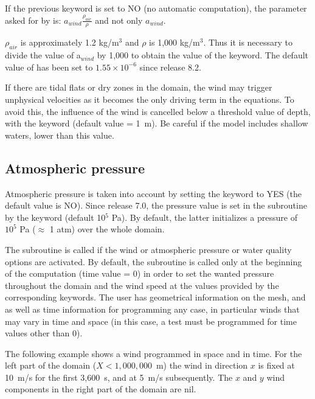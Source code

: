 If the previous keyword is set to NO (no automatic computation), the parameter
 asked for by  is:
$a_{wind} \frac{\rho_{air}}{\rho}$ and not only $a_{wind}$.

$\rho_{air}$ is approximately 1.2 kg/m$^3$ and $\rho$ is 1,000 kg/m$^3$.
Thus it is necessary to divide the value of a$_{wind}$ by 1,000
to obtain the value of the  keyword.
The default value of  has been set to
$1.55 \times 10^{-6}$ since release 8.2.

If there are tidal flats or dry zones in the domain, the wind may trigger
unphysical velocities as it becomes the only driving term in the equations.
To avoid this, the influence of the wind is cancelled below a threshold value
of depth, with the keyword 
(default value = 1~m).
Be careful if the model includes shallow waters, lower than this value.

\subsection{Atmospheric pressure}

Atmospheric pressure is taken into account by setting the keyword
 to YES (the default value is NO).
Since release 7.0, the pressure value is set in the 
subroutine by the keyword 
(default 10$^5$ Pa).
By default, the latter initializes a pressure of $10^5$ Pa ($\approx$ 1 atm)
over the whole domain.

The  subroutine is called if the wind or atmospheric pressure
or water quality options are activated.
By default, the subroutine is called only at the beginning of the computation
(time value = 0) in order to set the wanted pressure throughout the domain
and the wind speed at the values provided by the corresponding keywords.
The user has geometrical information on the mesh, and as well as time
information for programming any case, in particular winds that may vary in time
and space (in this case, a test must be programmed for time values other than 0).

The following example shows a wind programmed in space and in time.
For the left part of the domain ($ X < 1,000,000$~m) the wind in direction $x$
is fixed at 10~m/s for the first 3,600~s, and at 5~m/s subsequently.
The $x$ and $y$ wind components in the right part of the domain are nil.

